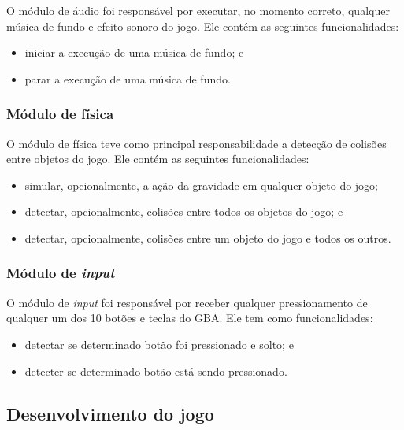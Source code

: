       O módulo de áudio foi responsável por executar, no momento correto, qualquer música de fundo e efeito sonoro do jogo. Ele contém as seguintes funcionalidades:

      \begin{itemize}
        \item iniciar a execução de uma música de fundo; e
        \item parar a execução de uma música de fundo.
      \end{itemize}

    \subsubsection{Módulo de física}

      O módulo de física teve como principal responsabilidade a detecção de colisões entre objetos do jogo. Ele contém as seguintes funcionalidades:

      \begin{itemize}
        \item simular, opcionalmente, a ação da gravidade em qualquer objeto do jogo;
        \item detectar, opcionalmente, colisões entre todos os objetos do jogo; e
        \item detectar, opcionalmente, colisões entre um objeto do jogo e todos os outros.
      \end{itemize}

    \subsubsection{Módulo de \textit{input}}

      O módulo de \textit{input} foi responsável por receber qualquer pressionamento de qualquer um dos 10 botões e teclas do GBA. Ele tem como funcionalidades:

      \begin{itemize}
        \item detectar se determinado botão foi pressionado e solto; e
        \item detecter se determinado botão está sendo pressionado.
      \end{itemize}

  \subsection{Desenvolvimento do jogo}


